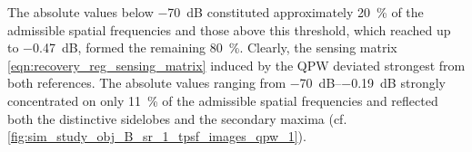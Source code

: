 The absolute values below
\SI{-70}{\deci\bel} constituted
approximately \SI{20}{\percent} of
the admissible spatial frequencies and
those above this threshold, which reached up to
\SI{-0.47}{\deci\bel}, formed
the remaining \SI{80}{\percent}.
Clearly,
the sensing matrix
\eqref{eqn:recovery_reg_sensing_matrix} induced by
the \ac{QPW} deviated
strongest from
both references.
The absolute values ranging from
\SIrange{-70}{-0.19}{\deci\bel} strongly concentrated on
only \SI{11}{\percent} of
the admissible spatial frequencies and reflected both
the distinctive sidelobes and
the secondary maxima
(cf. \cref{fig:sim_study_obj_B_sr_1_tpsf_images_qpw_1}).
